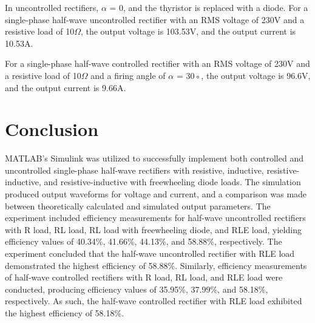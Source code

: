 In uncontrolled rectifiers, $ \alpha$ = 0, and the thyristor is replaced with a diode.
For a single-phase half-wave uncontrolled rectifier with an RMS voltage of 230V
and a resistive load of 10$ \Omega $,
the output voltage is 103.53V, and the output current is 10.53A.

For a single-phase half-wave controlled rectifier with an RMS voltage of 230V
and a resistive load of 10$ \Omega $ and a firing angle of $ \alpha  $ = 30◦, the output voltage
is 96.6V, and the output current is 9.66A.

\pagebreak











\section{Conclusion}


\hspace{\parindent}

MATLAB's Simulink was utilized to successfully implement both controlled and uncontrolled single-phase half-wave rectifiers with resistive, inductive, resistive-inductive, and resistive-inductive with freewheeling diode loads. The simulation produced output waveforms for voltage and current, and a comparison was made between theoretically calculated and simulated output parameters. The experiment included efficiency measurements for half-wave uncontrolled rectifiers with R load, RL load, RL load with freewheeling diode, and RLE load, yielding efficiency values of 40.34\%, 41.66\%, 44.13\%, and 58.88\%, respectively. The experiment concluded that the half-wave uncontrolled rectifier with RLE load demonstrated the highest efficiency of 58.88\%. Similarly, efficiency measurements of half-wave controlled rectifiers with R load, RL load, and RLE load were conducted, producing efficiency values of 35.95\%, 37.99\%, and 58.18\%, respectively. As such, the half-wave controlled rectifier with RLE load exhibited the highest efficiency of 58.18\%.
\pagebreak
